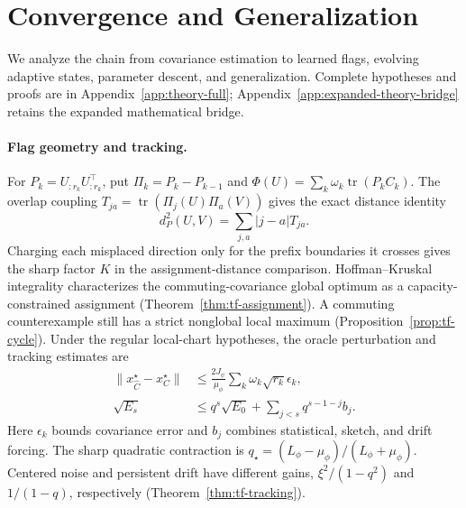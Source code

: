 \section{Convergence and Generalization}\label{sec:theory}
We analyze the chain from covariance estimation to learned flags, evolving adaptive states, parameter descent, and generalization. Complete hypotheses and proofs are in Appendix~\ref{app:theory-full}; Appendix~\ref{app:expanded-theory-bridge} retains the expanded mathematical bridge.

\paragraph{Flag geometry and tracking.}
For $P_k=U_{:r_k}U_{:r_k}^\top$, put $\Pi_k=P_k-P_{k-1}$ and $\Phi(U)=\sum_k\omega_k\operatorname{tr}(P_kC_k)$. The overlap coupling $T_{ja}=\operatorname{tr}(\Pi_j(U)\Pi_a(V))$ gives the exact distance identity
\begin{equation}
 d_P^2(U,V)=\sum_{j,a}|j-a|T_{ja}.
\end{equation}
Charging each misplaced direction only for the prefix boundaries it crosses gives the sharp factor $K$ in the assignment-distance comparison. Hoffman--Kruskal integrality characterizes the commuting-covariance global optimum as a capacity-constrained assignment (Theorem~\ref{thm:tf-assignment}). A commuting counterexample still has a strict nonglobal local maximum (Proposition~\ref{prop:tf-cycle}). Under the regular local-chart hypotheses, the oracle perturbation and tracking estimates are
\begin{align}
 \|x_{\widehat C}^\star-x_C^\star\|
 &\le\frac{2J_\psi}{\mu_\phi}\sum_k\omega_k\sqrt{r_k}\epsilon_k,\\
 \sqrt{E_s}&\le q^s\sqrt{E_0}+\sum_{j<s}q^{s-1-j}b_j.
\end{align}
Here $\epsilon_k$ bounds covariance error and $b_j$ combines statistical, sketch, and drift forcing. The sharp quadratic contraction is $q_\star=(L_\phi-\mu_\phi)/(L_\phi+\mu_\phi)$. Centered noise and persistent drift have different gains, $\xi^2/(1-q^2)$ and $1/(1-q)$, respectively (Theorem~\ref{thm:tf-tracking}).

